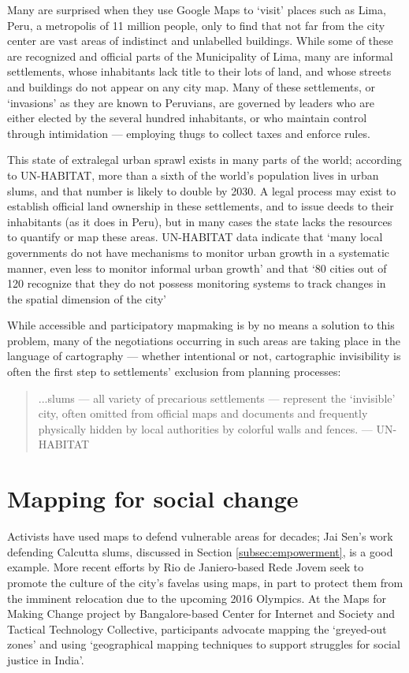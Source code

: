 \documentclass[11pt,oneside,notitlepage]{report}
\begin{document}
{{Many are surprised when they use Google Maps to `visit' places such as Lima, Peru, a metropolis of 11 million people, only to find that not far from the city center are vast areas of indistinct and unlabelled buildings. While some of these are recognized and official parts of the Municipality of Lima, many are informal settlements, whose inhabitants lack title to their lots of land, and whose streets and buildings do not appear on any city map. Many of these settlements, or `invasions' as they are known to Peruvians, are governed by leaders who are either elected by the several hundred inhabitants, or who maintain control through intimidation --- employing thugs to collect taxes and enforce rules. 

This state of extralegal urban sprawl exists in many parts of the world; according to UN-HABITAT, more than a sixth of the world's population lives in urban slums, and that number is likely to double by 2030. \cite{unhabitat2003challenge} A legal process may exist to establish official land ownership in these settlements, and to issue deeds to their inhabitants (as it does in Peru), but in many cases the state lacks the resources to quantify or map these areas. UN-HABITAT data indicate that `many local governments do not have mechanisms to monitor urban growth in a systematic manner, even less to monitor informal urban growth' and that `80 cities out of 120 recognize that they do not possess monitoring systems to track changes in the spatial dimension of the city' \cite{unhabitat2008slum}

While accessible and participatory mapmaking is by no means a solution to this problem, many of the negotiations occurring in such areas are taking place in the language of cartography --- whether intentional or not, cartographic invisibility is often the first step to settlements' exclusion from planning processes: 

\begin{quote}
...slums --- all variety of precarious settlements --- represent the `invisible' city, often omitted from official maps and documents and frequently physically hidden by local authorities by colorful walls and fences. 
--- UN-HABITAT \cite{unhabitat2003slums}
\end{quote}

\section{Mapping for social change}

Activists have used maps to defend vulnerable areas for decades; Jai Sen's work defending Calcutta slums, discussed in Section \ref{subsec:empowerment}, is a good example. More recent efforts by Rio de Janiero-based Rede Jovem seek to promote the culture of the city's favelas using maps, in part to protect them from the imminent relocation due to the upcoming 2016 Olympics. At the Maps for Making Change project by Bangalore-based Center for Internet and Society and Tactical Technology Collective, participants advocate mapping the `greyed-out zones' and using  `geographical mapping techniques to support struggles for social justice in India'. \cite{sen2010maps}

}}
\end{document}
